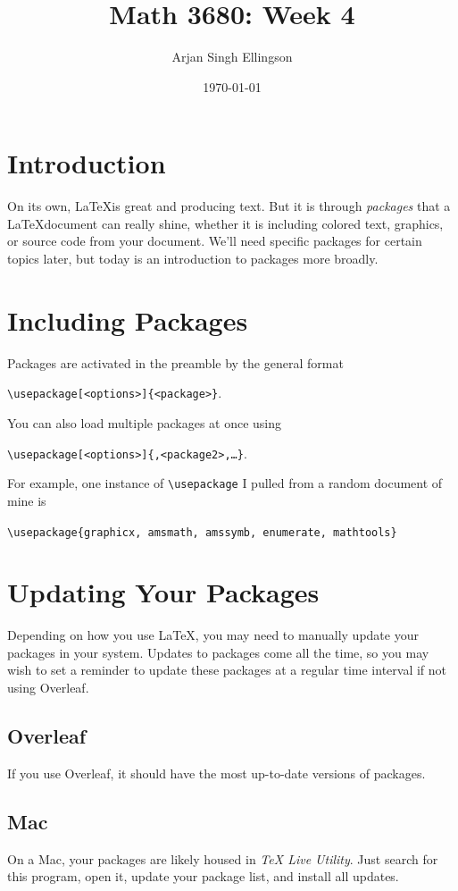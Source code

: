\documentclass{article} %
\title{Math 3680: Week 4}
\author{Arjan Singh Ellingson}
\date{\today}
\begin{document}
\maketitle

\section{Introduction}\label{sec:Intro}
On its own, \LaTeX is great and producing text. But it is through \emph{packages} that a \LaTeX document can really shine, whether it is including colored text, graphics, or source code from your document. We'll need specific packages for certain topics later, but today is an introduction to packages more broadly.

\section{Including Packages}
Packages are activated in the preamble by the general format
\begin{center}
	{\tt \textbackslash usepackage[<options>]\{<package>\}}.
\end{center}
You can also load multiple packages at once using
\begin{center}
	{\tt \textbackslash usepackage[<options>]\{<package1>,<package2>,\dots\}}.
\end{center}
For example, one instance of {\tt \textbackslash usepackage} I pulled from a random document of mine is
\begin{center}
	{\tt \textbackslash usepackage\{graphicx, amsmath, amssymb, enumerate, mathtools\}}
\end{center}

\section{Updating Your Packages}
Depending on how you use \LaTeX, you may need to manually update your packages in your system. Updates to packages come all the time, so you may wish to set a reminder to update these packages at a regular time interval if not using Overleaf.

\subsection{Overleaf}
If you use Overleaf, it should have the most up-to-date versions of packages.

\subsection{Mac} On a Mac, your packages are likely housed in \emph{TeX Live Utility}. Just search for this program, open it, update your package list, and install all updates.
\end{document}
